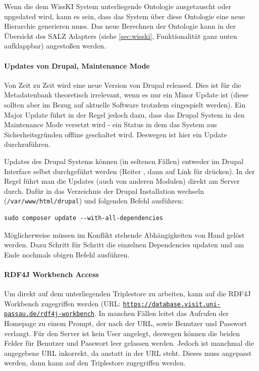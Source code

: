 Wenn die dem WissKI System unterliegende Ontologie ausgetauscht oder upgedated wird, kann es sein, dass das System über diese Ontologie eine neue Hierarchie generieren muss. Das neue Berechnen der Ontologie kann in der Übersicht des SALZ Adapters (siehe \autoref{sec:wisski}, Funktionalität ganz unten aufklappbar) angestoßen werden.

\paragraph{Updates von Drupal, Maintenance Mode}

Von Zeit zu Zeit wird eine neue Version von Drupal released. Dies ist für die Metadatenbank theoretisch irrelevant, wenn es nur ein Minor Update ist (diese sollten aber im Bezug auf aktuelle Software trotzdem eingespielt werden). Ein Major Update führt in der Regel jedoch dazu, dass das Drupal System in den Maintenance Mode versetzt wird - ein Status in dem das System aus Sicherheitsgründen offline geschaltet wird. Deswegen ist hier ein Update durchzuführen.

Updates des Drupal Systems können (in seltenen Fällen) entweder im Drupal Interface selbst durchgeführt werden (Reiter , dann auf Link für  drücken). In der Regel führt man die Updates (auch von anderen Modulen) direkt am Server durch. Dafür in das Verzeichnis der Drupal Installation wechseln (\texttt{/var/www/html/drupal}) und folgenden Befehl ausführen:

\begin{lstlisting}[style=MyBashStyle, caption={Befehl zum Updaten einer Drupal Installation.}]
sudo composer update --with-all-dependencies 
\end{lstlisting}

Möglicherweise müssen im Konflikt stehende Abhängigkeiten von Hand gelöst werden. Dazu Schritt für Schritt die einzelnen Dependencies updaten und am Ende nochmals obigen Befehl ausführen.

\paragraph{RDF4J Workbench Access}

Um direkt auf dem unterliegenden Triplestore zu arbeiten, kann auf die RDF4J Workbench zugegriffen werden (URL: \texttt{\url{https://database.visit.uni-passau.de/rdf4j-workbench}}. In manchen Fällen leitet das Aufrufen der Homepage zu einem Prompt, der nach der URL, sowie Benutzer und Passwort verlangt. Für den Server ist kein User angelegt, deswegen können die beiden Felder für Benutzer und Passwort leer gelassen werden. Jedoch ist manchmal die angegebene URL inkorrekt, da \texttt{} anstatt \texttt{} in der URL steht. Dieses muss angepasst werden, dann kann auf den Triplestore zugegriffen werden.

